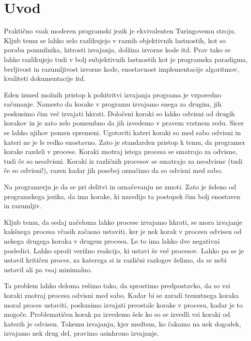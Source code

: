 \section{Uvod} \label{sec:uvod}


Praktično vsak moderen programski jezik je ekvivalenten Turingovemu stroju. Kljub temu se lahko zelo razlikujejo v raznih objektivnih lastnostih, kot so poraba pomnilnika, hitrosti izvajanja, dolžina izvorne kode itd. Prav tako se lahko razlikujejo tudi v bolj subjektivnih lastnostih kot je programska paradigma, berljivost in razumljivost izvorne kode, enostavnost implementacije algoritmov, kvaliteti dokumentacije itd.

Eden izmed možnih pristop k pohitritvi izvajanja programa je vzporedno računanje. Namesto da korake v programu izvajamo enega za drugim, jih poskusimo čim več izvajati hkrati. Določeni koraki so lahko odvisni od drugih korakov in je zato zelo pomembno da jih izvedemo v pravem vrstnem redu. Sicer se lahko njihov pomen spremeni. Ugotoviti kateri koraki so med sabo odvisni in kateri ne je le redko enostavno. Zato je standarden pristop k temu, da programer korake razdeli v procese. Koraki znotraj istega procesa se smatrajo za odvisne, tudi če so neodvisni. Koraki iz različnih procesov se smatrajo za neodvisne (tudi če so odvisni!), razen kadar jih posebej označimo da so odvisni med sabo.

Na programerju je da se pri delitvi in označevanju ne zmoti. Zato je želeno od programskega jezika, da ima korake, ki naredijo ta postopek čim bolj enostaven in razumljiv.

Kljub temu, da sedaj načeloma lahko procese izvajamo hkrati, se mora izvajanje kakšnega procesa včasih začasno ustaviti, ker je nek korak v procesu odvisen od nekega drugega koraka v drugem procesu. Le to ima lahko dve negativni posledici. Lahko sproži verižno reakcijo, ki ustavi še več procesov. Lahko pa se je ustavil kritičen proces, za katerega si iz različni razlogov želimo, da se nebi ustavil ali pa vsaj minimalno.


Ta problem lahko deloma rešimo tako, da sprostimo predpostavko, da so vsi koraki znotraj procesa odvisni med sabo. Kadar bi se zaradi trenutnega koraka moral proces ustaviti, poskusimo izvajati preostale korake v procesu, kadar je to mogoče. Problematičen korak pa izvedemo šele ko so se izvedli vsi koraki od katerih je odvisen. Takemu izvajanju, kjer medtem, ko čakamo na nek dogodek, izvajamo nek drug del, pravimo asinhrono izvajanje. 

